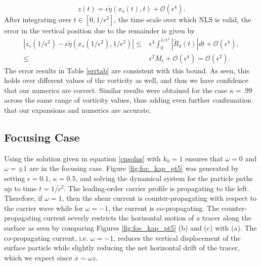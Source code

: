 \documentclass[a4paper,11pt]{article}
\begin{document}
\[
z(t) = \epsilon\tilde{\eta}(x_{s}(t),t) + \mathcal{O}(\epsilon^{4}).
\]
After integrating over $t\in[0,1/\epsilon^{2}]$, the time scale over which NLS is valid, the error in the vertical position due to the remainder is given by
\begin{align*}
\left|z_{s}(1/\epsilon^{2})-\epsilon\tilde{\eta}(x_{s}(1/\epsilon^{2}),1/\epsilon^{2})\right| \leq & \epsilon^{4}\int_{0}^{1/\epsilon^{2}}\left|\tilde{R}_{4}(t)\right| dt + \mathcal{O}(\epsilon^{4}),\\
\leq & \epsilon^{2}M_{\epsilon} + \mathcal{O}(\epsilon^{4}) = \mathcal{O}(\epsilon^{2}).
\end{align*}
The error results in Table \ref{errtab} are consistent with this bound.   As seen, this holds over different values of the vorticity as well, and thus we have confidence that our numerics are correct.  Similar results were obtained for the case $\kappa=.99$ across the same range of vorticity values, thus adding even further confirmation that our expansions and numerics are accurate.
\subsection{Focusing Case}
Using the solution given in equation \eqref{cnsolns} with $k_0=1$ ensures that $\omega = 0$ and $\omega=\pm 1$ are in the focusing case.   Figure \ref{fig:foc_kap_pt5} was generated by setting $\epsilon=0.1$, $\kappa=0.5$, and solving the dynamical system for the particle paths up to time $t=1/\epsilon^{2}$.  The leading-order carrier profile is propagating to the left.  Therefore, if $\omega=1$, then the shear current is counter-propagating with respect to the carrier wave while for $\omega=-1$, the current is co-propagating.  The counter-propagating current severly restricts the horizontal motion of a tracer along the surface as seen by comparing Figures \ref{fig:foc_kap_pt5} (b) and (c) with (a).  The co-propagating current, i.e. $\omega=-1$, reduces the vertical displacement of the surface particle while slightly reducing the net horizontal drift of the tracer, which we expect since $\dot{x}\sim \omega z$.    
\end{document}
